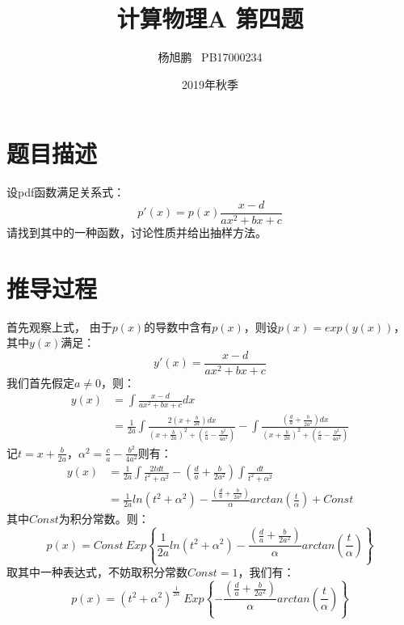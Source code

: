 \documentclass[a4paper,11pt]{article}
\author{ 杨旭鹏  \  PB17000234}
\date{2019年秋季}
\title{计算物理A 第四题}
\begin{document}
\maketitle

\section{题目描述}
设pdf函数满足关系式：
$$
	p'(x) = p(x)\frac{x-d}{ax^{2}+bx+c}
$$
请找到其中的一种函数，讨论性质并给出抽样方法。


\section{推导过程}
首先观察上式，
由于$p(x)$的导数中含有$p(x)$，则设$p(x) = exp(y(x))$，其中$y(x)$满足：
\begin{equation}
	y'(x) = \frac{x-d}{ax^{2}+bx+c}
\end{equation}
我们首先假定$a \neq 0 $，则：
\begin{equation}
\begin{aligned}
	y(x) &= \int \frac{x-d}{ax^{2}+bx+c}  dx  \\
	&= \frac{1}{2a} \int \frac{  2(x+\frac{b}{2a}) dx}{  (x+\frac{b}{2a})^{2}+(\frac{c}{a}-\frac{b^{2}}{4a^{2}})  }    -    \int \frac{(\frac{d}{a}+\frac{b}{2a^{2}})dx}{(x+\frac{b}{2a})^{2}+(\frac{c}{a}-\frac{b^{2}}{4a^{2}})}  
\end{aligned}
\end{equation}
记$t = x +\frac{b}{2a}$，$\alpha^{2} = \frac{c}{a}-\frac{b^{2}}{4a^{2}}$则有：
\begin{equation}
\begin{aligned}
	y(x) &= \frac{1}{2a} \int \frac{2tdt}{t^{2}+\alpha^{2}} - (\frac{d}{a}+\frac{b}{2a^{2}}) \int \frac{dt}{t^{2}+\alpha^{2}} \\
	&= \frac{1}{2a} ln(t^{2}+\alpha^{2}) -  \frac{  (\frac{d}{a}+\frac{b}{2a^{2}}) }{\alpha} arctan(\frac{t}{\alpha}) + Const
\end{aligned}
\end{equation}
其中$Const$为积分常数。则：
\begin{equation}
	p(x) = Const \ Exp \left\{  
	\frac{1}{2a} ln(t^{2}+\alpha^{2}) -  \frac{  (\frac{d}{a}+\frac{b}{2a^{2}}) }{\alpha} arctan(\frac{t}{\alpha})
	 \right\}
\end{equation}
取其中一种表达式，不妨取积分常数$Const = 1$，我们有：
\begin{equation}
	p(x) = (t^{2}+\alpha^{2})^{\frac{1}{2\alpha}}
	 ~ Exp \left\{ - \frac{  (\frac{d}{a}+\frac{b}{2a^{2}}) }{\alpha} arctan(\frac{t}{\alpha})
	 \right\}
\end{equation}
\end{document}
